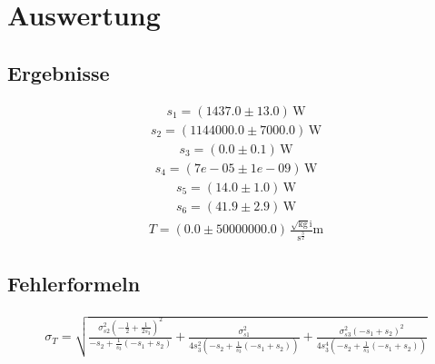 \documentclass[a4paper,10pt]{scrbook}
\begin{document}
\section*{Auswertung}

\subsection*{Ergebnisse}

\begin{align*}s_1 = (1437.0\pm 13.0)\,\mathrm{W}\end{align*}\begin{align*}s_2 = (1144000.0\pm 7000.0)\,\mathrm{W}\end{align*}\begin{align*}s_3 = (0.0\pm 0.1)\,\mathrm{W}\end{align*}\begin{align*}s_4 = (7e-05\pm 1e-09)\,\mathrm{W}\end{align*}\begin{align*}s_5 = (14.0\pm 1.0)\,\mathrm{W}\end{align*}\begin{align*}s_6 = (41.9\pm 2.9)\,\mathrm{W}\end{align*}\begin{align*}T = (0.0\pm 50000000.0)\,\mathrm{\frac{\sqrt{kg} i}{s^{\frac{3}{2}}} m}\end{align*}

\subsection*{Fehlerformeln}

\begin{align*}\sigma_{T}=\sqrt{\frac{\sigma_{{s 2}}^{2} \left(- \frac{1}{2} + \frac{1}{2 s_{3}}\right)^{2}}{- s_{2} + \frac{1}{s_{3}} \left(- s_{1} + s_{2}\right)} + \frac{\sigma_{{s 1}}^{2}}{4 s_{3}^{2} \left(- s_{2} + \frac{1}{s_{3}} \left(- s_{1} + s_{2}\right)\right)} + \frac{\sigma_{{s 3}}^{2} \left(- s_{1} + s_{2}\right)^{2}}{4 s_{3}^{4} \left(- s_{2} + \frac{1}{s_{3}} \left(- s_{1} + s_{2}\right)\right)}}\end{align*}
\end{document}
